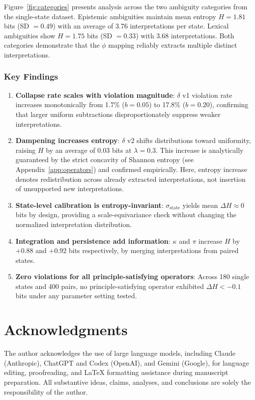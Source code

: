 \documentclass[11pt,a4paper]{article}
\begin{document}
Figure~\ref{fig:categories} presents analysis across the two 
ambiguity categories from the single-state dataset. 
Epistemic ambiguities maintain mean entropy $H = 1.81$ bits 
(SD $= 0.49$) with an average of 3.76 interpretations per state. 
Lexical ambiguities show $H = 1.75$ bits (SD $= 0.33$) with 
3.68 interpretations. Both categories demonstrate that the 
$\phi$ mapping reliably extracts multiple distinct interpretations.

\subsubsection{Key Findings}

\begin{enumerate}
    \item \textbf{Collapse rate scales with violation magnitude}: 
          $\delta$ v1 violation rate increases monotonically from 
          1.7\% ($b=0.05$) to 17.8\% ($b=0.20$), confirming that 
          larger uniform subtractions disproportionately suppress 
          weaker interpretations.
    
    \item \textbf{Dampening increases entropy}: $\delta$ v2 shifts 
          distributions toward uniformity, raising $H$ by an average 
          of 0.03 bits at $\lambda = 0.3$. This increase is 
          analytically guaranteed by the strict concavity of Shannon 
          entropy (see Appendix~\ref{app:operators}) and confirmed 
          empirically. Here, entropy increase denotes redistribution
          across already extracted interpretations, not insertion of
          unsupported new interpretations.
    
    \item \textbf{State-level calibration is entropy-invariant}: 
          $\sigma_{\mathrm{state}}$ yields mean $\Delta H \approx 0$ bits by design,
          providing a scale-equivariance check without changing the normalized
          interpretation distribution.
    
    \item \textbf{Integration and persistence add information}: 
          $\kappa$ and $\pi$ increase $H$ by $+0.88$ and $+0.92$ bits 
          respectively, by merging interpretations from paired states.
    
    \item \textbf{Zero violations for all principle-satisfying operators}: 
          Across 180 single states and 400 pairs, no principle-satisfying 
          operator exhibited $\Delta H < -0.1$ bits under any parameter 
          setting tested.
\end{enumerate}

\section*{Acknowledgments}

The author acknowledges the use of large language models, including Claude (Anthropic), ChatGPT and Codex (OpenAI), and Gemini (Google), for language editing, proofreading, and LaTeX formatting assistance during manuscript preparation. All substantive ideas, claims, analyses, and conclusions are solely the responsibility of the author.
\end{document}
